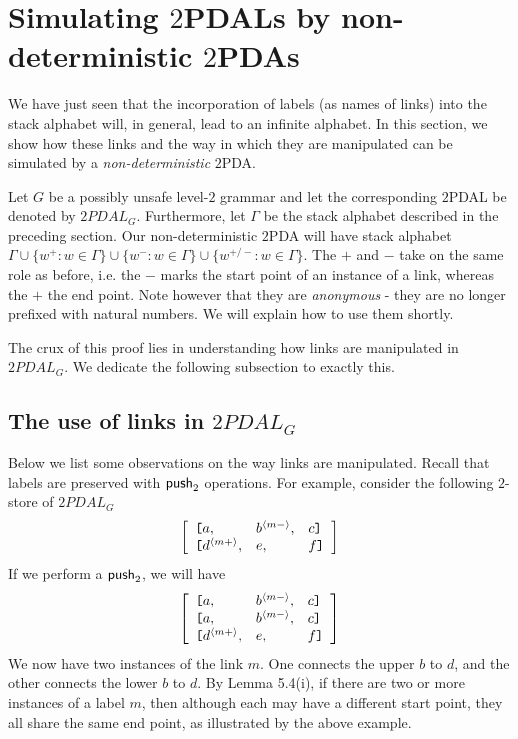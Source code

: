 \section{Simulating $2$PDALs by non-deterministic $2$PDAs}

We have just seen that the incorporation of labels (as names of
links) into the stack alphabet will, in general, lead to an
infinite alphabet. In this section, we show how these links and
the way in which they are manipulated can be simulated by a
\emph{non-deterministic} $2$PDA.

Let $G$ be a possibly unsafe level-$2$ grammar and let the
corresponding $2$PDAL be denoted by $2PDAL_G$. Furthermore, let
$\Gamma$ be the stack alphabet described in the preceding section.
Our non-deterministic $2$PDA will have stack alphabet $\Gamma \cup
\{w^+ : w \in \Gamma\} \cup \{w^- : w \in \Gamma\} \cup \{w^{+/-}
: w \in \Gamma\}$. The $+$ and $-$ take on the same role as
before, i.e. the $-$ marks the start point of an instance of a
link, whereas the $+$ the end point. Note however that they are
\emph{anonymous} - they are no longer prefixed with natural
numbers.  We will explain how to use them shortly.

The crux of this proof lies in understanding how links are
manipulated in $2PDAL_G$. We dedicate the following
subsection to exactly this.

\subsection{The use of links in $2PDAL_G$}

Below we list some observations on the way links are manipulated.
Recall that labels are preserved with ${\sf push}_2$ operations. For
example, consider the following $2$-store of $2PDAL_G$
\begin{equation}
\nonumber \left [ \begin{array}{lll} \hbox{\tt [}a, & {b}^{\langle{m-}\rangle},
& c\hbox{\tt ]}\\ \hbox{\tt [}{d}^{\langle{m+}\rangle}, & e, & f\hbox{\tt ]}
\end{array} \right ]
\end{equation}
If we perform a ${\sf push}_2$, we will have
\begin{equation}
\nonumber \left [ \begin{array}{lll}
\hbox{\tt [}a, & {b}^{\langle{m-}\rangle}, & c\hbox{\tt ]}\\
\hbox{\tt [}a, & {b}^{\langle{m-}\rangle}, & c\hbox{\tt ]}\\
\hbox{\tt [}{d}^{\langle{m+}\rangle}, & e, & f\hbox{\tt ]}
\end{array} \right ]
\end{equation}
We now have two instances of the link $m$. One connects the upper
$b$ to $d$, and the other connects the lower $b$ to $d$. By Lemma
5.4(i), if there are two or more instances of a label $m$, then
although each may have a different start point, they all share the
same end point, as illustrated by the above example.

